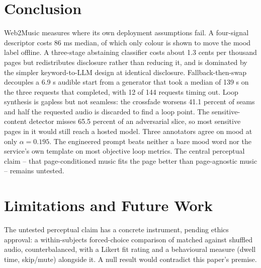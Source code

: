 \documentclass[conference]{IEEEtran}
\begin{document}
\section{Conclusion}

Web2Music measures where its own deployment assumptions fail. A
four-signal descriptor costs 86 ms median, of which only colour is shown
to move the mood label offline. A three-stage abstaining classifier costs
about 1.3 cents per thousand pages but redistributes disclosure rather
than reducing it, and is dominated by the simpler keyword-to-LLM design
at identical disclosure. Fallback-then-swap decouples a 6.9 s audible
start from a generator that took a median of 139 s on the three requests
that completed, with 12 of 144 requests timing out. Loop synthesis is
gapless but not seamless: the crossfade worsens 41.1 percent of seams and
half the requested audio is discarded to find a loop point. The
sensitive-content detector misses 65.5 percent of an adversarial slice,
so most sensitive pages in it would still reach a hosted model. Three
annotators agree on mood at only $\alpha=0.195$. The engineered prompt
beats neither a bare mood word nor the service's own template on most
objective loop metrics. The central perceptual claim -- that
page-conditioned music fits the page better than page-agnostic music --
remains untested.

\section{Limitations and Future Work}
\label{sec:limitations}

The untested perceptual claim has a concrete instrument, pending ethics
approval: a within-subjects forced-choice comparison of matched against
shuffled audio, counterbalanced, with a Likert fit rating and a
behavioural measure (dwell time, skip/mute) alongside it. A null result
would contradict this paper's premise.
\end{document}

